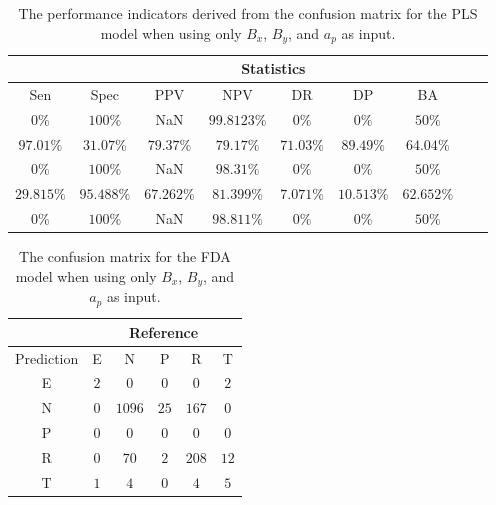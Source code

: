 \begin{table}[!ht]
	\centering
	\begin{tabular}{|c|c|c|c|c|c|c|c|c|}
		\hline
		 & \multicolumn{7}{c|}{Statistics} \\ \hline
		Sen & Spec & PPV & NPV & DR & DP & BA \\ \hline
		$0\%$ & $100\%$ & NaN & $99.8123\%$ & $0\%$ & $0\%$ & $50\%$ \\ \hline
		$97.01\%$ & $31.07\%$ & $79.37\%$ & $79.17\%$ & $71.03\%$ & $89.49\%$ & $64.04\%$ \\ \hline
		$0\%$ & $100\%$ & NaN & $98.31\%$ & $0\%$ & $0\%$ & $50\%$ \\ \hline
		$29.815\%$ & $95.488\%$ & $67.262\%$ & $81.399\%$ & $7.071\%$ & $10.513\%$ & $62.652\%$ \\ \hline
		$0\%$ & $100\%$ & NaN & $98.811\%$ & $0\%$ & $0\%$ & $50\%$ \\ \hline
	\end{tabular}
	\caption{The performance indicators derived from the confusion matrix for the PLS model when using only $B_{x}$, $B_{y}$, and $a_{p}$ as input.}
	\label{tab:cs:xyap:pls}
\end{table}

\begin{table}[!ht]
	\centering
	\begin{tabular}{|c|c|c|c|c|c|}
		\hline
		 & \multicolumn{5}{|c|}{Reference} \\ \hline
		 Prediction & E & N & P & R & T \\ \hline
		 E & $2$ & $0$ & $0$ & $0$ & $2$ \\ \hline
		 N & $0$ & $1096$ & $25$ & $167$ & $0$ \\ \hline
		 P & $0$ & $0$ & $0$ & $0$ & $0$ \\ \hline
		 R & $0$ & $70$ & $2$ & $208$ & $12$ \\ \hline
		 T & $1$ & $4$ & $0$ & $4$ & $5$ \\ \hline
	\end{tabular}
	\caption{The confusion matrix for the FDA model when using only $B_{x}$, $B_{y}$, and $a_{p}$ as input.}
	\label{tab:cm:xyap:fda}
\end{table}

